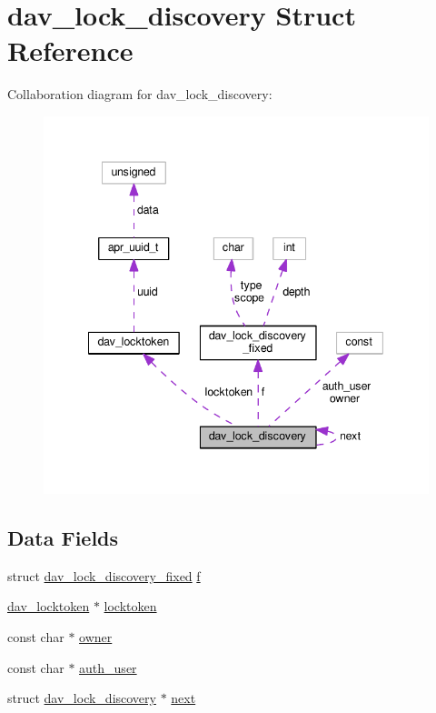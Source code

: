 \hypertarget{structdav__lock__discovery}{}\section{dav\+\_\+lock\+\_\+discovery Struct Reference}
\label{structdav__lock__discovery}


Collaboration diagram for dav\+\_\+lock\+\_\+discovery\+:
\nopagebreak
\begin{figure}[H]
\begin{center}
\leavevmode
\includegraphics[width=341pt]{structdav__lock__discovery__coll__graph}
\end{center}
\end{figure}
\subsection*{Data Fields}
\begin{DoxyCompactItemize}
\item 
struct \hyperlink{structdav__lock__discovery__fixed}{dav\+\_\+lock\+\_\+discovery\+\_\+fixed} \hyperlink{structdav__lock__discovery_ab52935f2bf70c231c596ad520a1161f4}{f}
\item 
\hyperlink{structdav__locktoken}{dav\+\_\+locktoken} $\ast$ \hyperlink{structdav__lock__discovery_adcbb35d9d5cb4018fa9815566a9aa44e}{locktoken}
\item 
const char $\ast$ \hyperlink{structdav__lock__discovery_a7df51e7814b605278b709bd8c29d4861}{owner}
\item 
const char $\ast$ \hyperlink{structdav__lock__discovery_a737faeec78dac66af3c6fa8503fc6f3b}{auth\+\_\+user}
\item 
struct \hyperlink{structdav__lock__discovery}{dav\+\_\+lock\+\_\+discovery} $\ast$ \hyperlink{structdav__lock__discovery_a5ce249ebf865d7f7abd6e03a4b58e33d}{next}
\end{DoxyCompactItemize}


